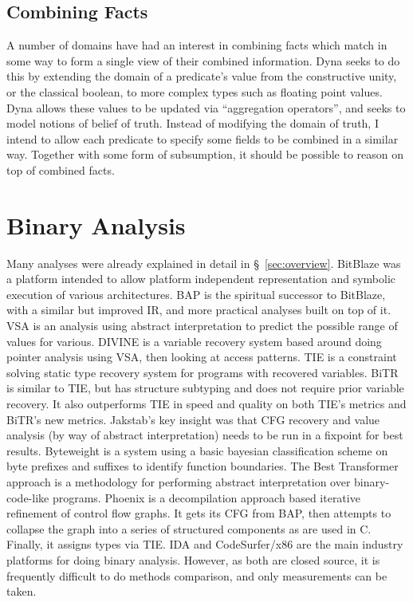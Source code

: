 \subsection{Combining Facts}
A number of domains have had an interest in combining facts which match in some way to form a single view of their combined information.
Dyna\cite{dyna} seeks to do this by extending the domain of a predicate's value from the constructive unity, or the classical boolean, to more complex types such as floating point values.
Dyna allows these values to be updated via ``aggregation operators'', and seeks to model notions of belief of truth.
Instead of modifying the domain of truth, I intend to allow each predicate to specify some fields to be combined in a similar way.
Together with some form of subsumption, it should be possible to reason on top of combined facts.

\section{Binary Analysis}
Many analyses were already explained in detail in \S~\ref{sec:overview}.
BitBlaze\cite{bitblaze} was a platform intended to allow platform independent representation and symbolic execution of various architectures.
BAP\cite{bap} is the spiritual successor to BitBlaze, with a similar but improved IR, and more practical analyses built on top of it.
VSA\cite{vsa} is an analysis using abstract interpretation to predict the possible range of values for various.
DIVINE\cite{divine} is a variable recovery system based around doing pointer analysis using VSA, then looking at access patterns.
TIE\cite{tie} is a constraint solving static type recovery system for programs with recovered variables.
BiTR\cite{bitr} is similar to TIE, but has structure subtyping and does not require prior variable recovery. It also outperforms TIE in speed and quality on both TIE's metrics and BiTR's new metrics.
Jakstab's\cite{jakstab} key insight was that CFG recovery and value analysis (by way of abstract interpretation) needs to be run in a fixpoint for best results.
Byteweight\cite{byteweight} is a system using a basic bayesian classification scheme on byte prefixes and suffixes to identify function boundaries.
The Best Transformer\cite{besttransformer} approach is a methodology for performing abstract interpretation over binary-code-like programs.
Phoenix\cite{phoenix} is a decompilation approach based iterative refinement of control flow graphs. It gets its CFG from BAP\cite{bap}, then attempts to collapse the graph into a series of structured components as are used in C. Finally, it assigns types via TIE\cite{tie}.
IDA\cite{ida} and CodeSurfer/x86\cite{codesurfer} are the main industry platforms for doing binary analysis. However, as both are closed source, it is frequently difficult to do methods comparison, and only measurements can be taken.

